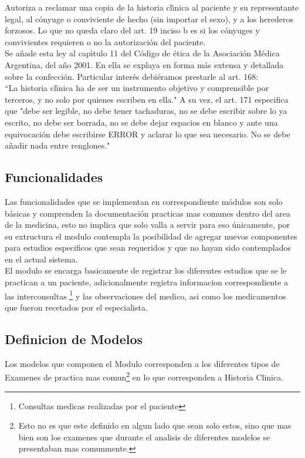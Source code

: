 Autoriza a reclamar una copia de la historia cl\'{\i}nica al paciente y su representante 
legal, al c\'onyuge o conviviente de hecho (sin importar el sexo), y a los herederos 
forzosos. Lo que no queda claro del art. 19 inciso b es si los c\'onyuges y 
convivientes requieren o no la autorizaci\'on del paciente.\\[0.1cm]

Se a\~nade esta ley al cap\'{\i}tulo 11 del C\'odigo de \'etica de la Asociaci\'on M\'edica 
Argentina, del a\~no 2001. En ella se explaya en forma m\'as extensa y detallada sobre
la confecci\'on. Particular inter\'es debi\'eramos prestarle al art. 168:\\[0.1cm]

``La historia cl\'{\i}nica ha de ser un instrumento objetivo y comprensible por terceros,
y no solo por quienes escriben en ella." A su vez, el art. 171 especifica que 
"debe ser legible, no debe tener tachaduras, no se debe escribir sobre lo ya 
escrito, no debe ser borrada, no se debe dejar espacios en blanco y ante una
equivocaci\'on debe escribirse ERROR y aclarar lo que sea necesario. No se debe a\~nadir
nada entre renglones."


\subsection{Funcionalidades}

Las funcionalidades que se implementan en correspondiente m\'odulos son solo
b\'asicas y comprenden la documentaci\'on practicas mas comunes dentro del area de la 
medicina, esto no implica que solo valla a servir para eso \'unicamente, por su 
extructura el modulo contempla la posibilidad de agregar nuevos componentes para 
estudios especificos que sean requeridos y que no hayan sido contemplados en el 
actual sistema.\\[0.1cm]


El modulo se encarga basicamente de registrar los diferentes estudios que se le 
practican a un paciente, adicionalmente registra informacion correspondiente a 
las interconsultas \footnote{Consultas medicas realizadas por el paciente} y las
observaciones del medico, asi como los medicamentos que fueron recetados por el 
especialista.


\subsection{Definicion de Modelos}

Los modelos que componen el Modulo corresponden a los diferentes tipos de 
Examenes de practica mas comun\footnote{Esto no es que este definido en algun 
lado que sean solo estos, sino que mas bien son los examenes que durante el 
analisis de diferentes modelos se presentaban mas comunmente.} en lo que 
corresponden a Historia Clinica.\\[0.1cm]


